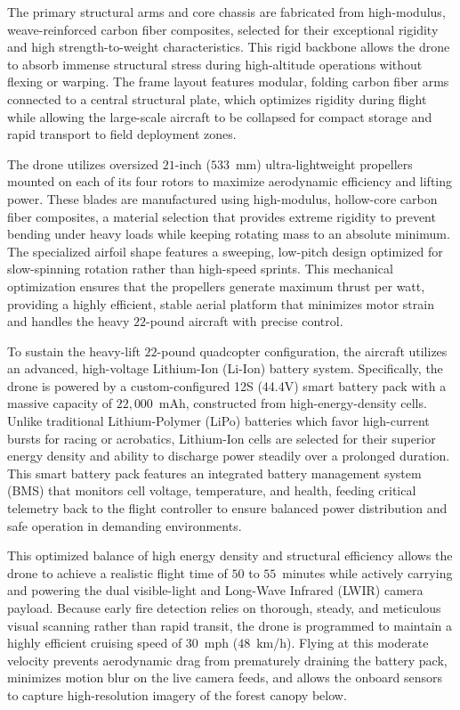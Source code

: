 \documentclass[journal, onecolumn]{IEEEtran}
\begin{document}
The primary structural arms and core chassis are fabricated from high-modulus, weave-reinforced carbon fiber composites, selected for their exceptional rigidity and high strength-to-weight characteristics. This rigid backbone allows the drone to absorb immense structural stress during high-altitude operations without flexing or warping. The frame layout features modular, folding carbon fiber arms connected to a central structural plate, which optimizes rigidity during flight while allowing the large-scale aircraft to be collapsed for compact storage and rapid transport to field deployment zones.

The drone utilizes oversized $21$-inch ($533$~mm) ultra-lightweight propellers mounted on each of its four rotors to maximize aerodynamic efficiency and lifting power. These blades are manufactured using high-modulus, hollow-core carbon fiber composites, a material selection that provides extreme rigidity to prevent bending under heavy loads while keeping rotating mass to an absolute minimum. The specialized airfoil shape features a sweeping, low-pitch design optimized for slow-spinning rotation rather than high-speed sprints. This mechanical optimization ensures that the propellers generate maximum thrust per watt, providing a highly efficient, stable aerial platform that minimizes motor strain and handles the heavy $22$-pound aircraft with precise control.

To sustain the heavy-lift $22$-pound quadcopter configuration, the aircraft utilizes an advanced, high-voltage Lithium-Ion (Li-Ion) battery system. Specifically, the drone is powered by a custom-configured 12S (44.4V) smart battery pack with a massive capacity of $22,000$~mAh, constructed from high-energy-density cells. Unlike traditional Lithium-Polymer (LiPo) batteries which favor high-current bursts for racing or acrobatics, Lithium-Ion cells are selected for their superior energy density and ability to discharge power steadily over a prolonged duration. This smart battery pack features an integrated battery management system (BMS) that monitors cell voltage, temperature, and health, feeding critical telemetry back to the flight controller to ensure balanced power distribution and safe operation in demanding environments.

This optimized balance of high energy density and structural efficiency allows the drone to achieve a realistic flight time of $50$ to $55$~minutes while actively carrying and powering the dual visible-light and Long-Wave Infrared (LWIR) camera payload. Because early fire detection relies on thorough, steady, and meticulous visual scanning rather than rapid transit, the drone is programmed to maintain a highly efficient cruising speed of $30$~mph ($48$~km/h). Flying at this moderate velocity prevents aerodynamic drag from prematurely draining the battery pack, minimizes motion blur on the live camera feeds, and allows the onboard sensors to capture high-resolution imagery of the forest canopy below.
\end{document}
